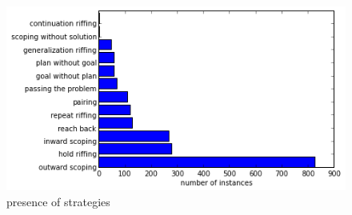 
\begin{figure}[h!]
    \centering
    \includegraphics[width=0.9\columnwidth]{strategy_counts}
    \caption{presence of strategies}
    \label{fig:strategy_counts}
\end{figure}

